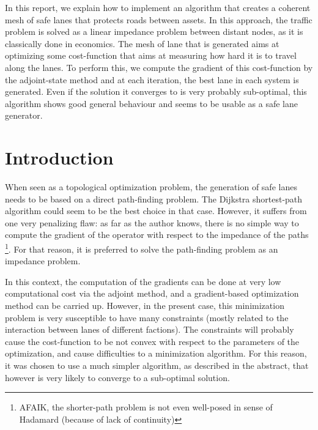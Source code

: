 \documentclass[11pt,a4paper]{article}		%
\begin{document}
\begin{center}
\end{center}

In this report, we explain how to implement an algorithm that creates a coherent mesh of safe lanes that protects roads between assets. In this approach, the traffic problem is solved as a linear impedance problem between distant nodes, as it is classically done in economics. The mesh of lane that is generated aims at optimizing some cost-function that aims at measuring how hard it is to travel along the lanes. To perform this, we compute the gradient of this cost-function by the adjoint-state method and at each iteration, the best lane in each system is generated. Even if the solution it converges to is very probably sub-optimal, this algorithm shows good general behaviour and seems to be usable as a safe lane generator.

\section{Introduction}

When seen as a topological optimization problem, the generation of safe lanes needs to be based on a direct path-finding problem. The Dijkstra shortest-path algorithm could seem to be the best choice in that case. However, it suffers from one very penalizing flaw: as far as the author knows, there is no simple way to compute the gradient of the operator with respect to the impedance of the paths \footnote{AFAIK, the shorter-path problem is not even well-posed in sense of Hadamard (because of lack of continuity)}. For that reason, it is preferred to solve the path-finding problem as an impedance problem.

In this context, the computation of the gradients can be done at very low computational cost via the adjoint method, and a gradient-based optimization method can be carried up. However, in the present case, this minimization problem is very susceptible to have many constraints (mostly related to the interaction between lanes of different factions). The constraints will probably cause the cost-function to be not convex with respect to the parameters of the optimization, and cause difficulties to a minimization algorithm. For this reason, it was chosen to use a much simpler algorithm, as described in the abstract, that however is very likely to converge to a sub-optimal solution.
\end{document}
